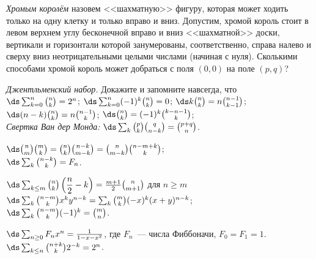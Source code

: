 \begin{problems}

\item
\emph{Хромым королём} назовем <<шахматную>> фигуру, которая может ходить только
на одну клетку и только вправо и вниз.
Допустим, хромой король стоит в левом верхнем углу бесконечной вправо и вниз
<<шахматной>> доски, вертикали и горизонтали которой занумерованы,
соответственно, справа налево и сверху вниз неотрицательными целыми числами
(начиная с нуля).
Сколькими способами хромой король может добраться с поля $(0, 0)$ на поле
$(p, q)$?

\item\emph{Джентльменский набор.}
Докажите и запомните навсегда, что
\\[1ex]
\sbp
\(\ds
    \sum_{k = 0}^n
        \binom{n}{k}
=
    2^n
\);
\qquad
\sbp
\(\ds
    \sum_{k = 0}^n
        (-1)^{k} \binom{n}{k}
=
    0
\);
\qquad
\sbp
\(\ds
    k \binom{n}{k}
=
    n \binom{n-1}{k-1}
\);
\\[0.5ex]
\sbp
\(\ds
    (n - k) \binom{n}{k}
=
    n \binom{n-1}{k}
\);
\qquad
\sbp
\(\ds
    \binom{n}{k}
=
    (-1)^k \binom{k - n - 1}{k}
\);
\\[1ex]
\sbp\emph{Свертка Ван дер Монда:}
\quad
\(\ds
    \sum_{k}
        \binom{p}{k}
        \binom{q}{n - k}
=
    \binom{p + q}{n}
\).

\item
\sbp
\(\ds
    \binom{n}{m} \binom{m}{k}
=
    \binom{n}{k} \binom{n - k}{m - k}
=
    \binom{n}{m - k}
    \binom{n - m + k}{k}
\);
\\[1ex]
\sbp
\(\ds
    \sum_{k}
        \binom{n - k}{k}
=
    F_n
\).

\item
\sbp
\(\ds
    \sum_{k \leq m}
        \binom{n}{k}
        \left(
            \dfrac{n}{2} - k
        \right)
=
    \frac{m + 1}{2}
    \binom{n}{m + 1}
\)
для $n\geq m$
\\[0.5ex]
\sbp
\(\ds
    \sum_{k}
    \binom{n - m}{k}
    x^k y^{n - k}
=
    \sum_{k}
        \binom{m}{k}
        (-x)^k (x + y)^{n - k}
\);
\\[0.5ex]
\sbp
\(\ds
    \sum_{k}
        \binom{n - m}{k}
        (-1)^k
=
    \binom{m}{n}
\).

\item
\sbp
\(\ds
    \sum_{n \geq 0}
        F_n x^n
=
    \frac{1}{1 - x - x^2}
\), где $F_n$~--- числа Фиббоначи, $F_0 = F_1 = 1$.
\\[0.5ex]
\sbp
\(\ds
    \sum_{k \leq n}
        \binom{n + k}{k} 2^{-k}
=
    2^n
\).

\end{problems}

